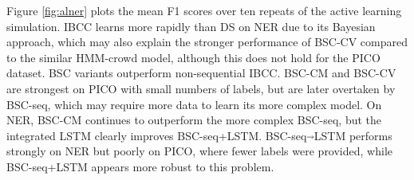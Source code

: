 %
Figure \ref{fig:alner} plots the mean F1 scores over ten repeats of the active learning simulation.
IBCC learns more rapidly than DS on NER due to its Bayesian approach,
which may also explain the stronger performance
of BSC-CV compared to the similar HMM-crowd model, although this does not hold for the PICO dataset.
BSC variants outperform non-sequential IBCC. BSC-CM and BSC-CV are strongest on PICO with small numbers of labels,
but are later overtaken by BSC-seq, which may require more data to learn its more complex model.
On NER, BSC-CM continues to outperform the more complex BSC-seq,
but the integrated LSTM clearly improves BSC-seq+LSTM.
BSC-seq$\Arrow{0.2cm}$LSTM performs strongly on NER but poorly on PICO, where fewer labels were provided,
while BSC-seq+LSTM appears more robust to this problem.  

